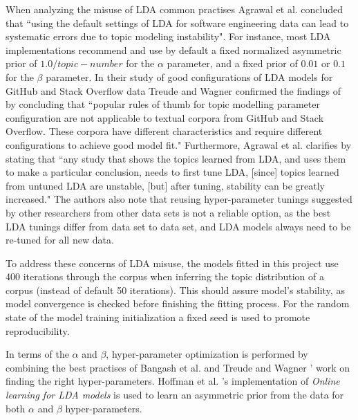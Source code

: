         When analyzing the misuse of LDA common practises Agrawal et al. \cite{agrawal2018wrong} concluded that ``using the default settings of LDA for software engineering data can lead to systematic errors due to topic modeling instability". For instance, most LDA implementations recommend and use by default a fixed normalized asymmetric prior of $1.0 / topic-number$ for the $\alpha$ parameter, and a fixed prior of $0.01$ or $0.1$ for the $\beta$ parameter. In their study of good configurations of LDA models for GitHub and Stack Overflow data Treude and Wagner \cite{treude2019predicting} confirmed the findings of \cite{agrawal2018wrong} by concluding that ``popular rules of thumb for topic modelling parameter configuration are not applicable to textual corpora from GitHub and Stack Overflow. These corpora have different characteristics and require different configurations to achieve good model fit." Furthermore, Agrawal et al. \cite{agrawal2018wrong} clarifies by stating that ``any study that shows the topics learned from LDA, and uses them to make a particular conclusion, needs to first tune LDA,  [since] topics learned from untuned LDA are unstable, [but] after tuning, stability can be greatly increased." The authors also note that reusing hyper-parameter tunings suggested by other researchers from other data sets is not a reliable option, as the best LDA tunings differ from data set to data set, and LDA models always need to be re-tuned for all new data.
        
        To address these concerns of LDA misuse, the models fitted in this project use 400 iterations through the corpus when inferring the topic distribution of a corpus (instead of default 50 iterations). This should assure model's stability, as model convergence is checked before finishing the fitting process. For the random state of the model training initialization a fixed seed is used to promote reproducibility. 
        
        In terms of the $\alpha$ and $\beta$, hyper-parameter optimization is performed by combining the best practises of Bangash et al. \cite{bangash2019developers} and Treude and Wagner \cite{treude2019predicting}' work on finding the right hyper-parameters. Hoffman et al. \cite{hoffman2010online}'s implementation of \textit{Online learning for LDA models} is used to learn an asymmetric prior from the data for both $\alpha$ and $\beta$  hyper-parameters.
        

